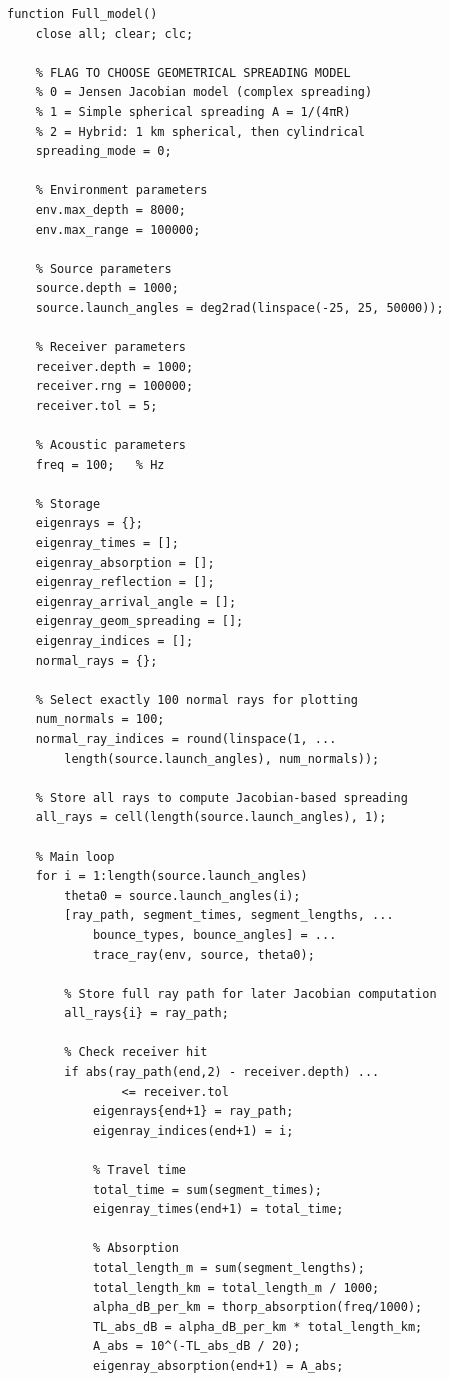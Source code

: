 \documentclass[fleqn]{jaes}
\begin{document}
\begin{verbatim}
function Full_model()
    close all; clear; clc;

    % FLAG TO CHOOSE GEOMETRICAL SPREADING MODEL
    % 0 = Jensen Jacobian model (complex spreading)
    % 1 = Simple spherical spreading A = 1/(4πR)
    % 2 = Hybrid: 1 km spherical, then cylindrical
    spreading_mode = 0;

    % Environment parameters
    env.max_depth = 8000;
    env.max_range = 100000;

    % Source parameters
    source.depth = 1000;
    source.launch_angles = deg2rad(linspace(-25, 25, 50000));

    % Receiver parameters
    receiver.depth = 1000;
    receiver.rng = 100000;
    receiver.tol = 5;

    % Acoustic parameters
    freq = 100;   % Hz

    % Storage
    eigenrays = {};
    eigenray_times = [];
    eigenray_absorption = [];
    eigenray_reflection = [];
    eigenray_arrival_angle = [];
    eigenray_geom_spreading = [];
    eigenray_indices = [];
    normal_rays = {};

    % Select exactly 100 normal rays for plotting
    num_normals = 100;
    normal_ray_indices = round(linspace(1, ...
        length(source.launch_angles), num_normals));

    % Store all rays to compute Jacobian-based spreading
    all_rays = cell(length(source.launch_angles), 1);

    % Main loop
    for i = 1:length(source.launch_angles)
        theta0 = source.launch_angles(i);
        [ray_path, segment_times, segment_lengths, ...
            bounce_types, bounce_angles] = ...
            trace_ray(env, source, theta0);

        % Store full ray path for later Jacobian computation
        all_rays{i} = ray_path;

        % Check receiver hit
        if abs(ray_path(end,2) - receiver.depth) ...
                <= receiver.tol
            eigenrays{end+1} = ray_path;
            eigenray_indices(end+1) = i;

            % Travel time
            total_time = sum(segment_times);
            eigenray_times(end+1) = total_time;

            % Absorption
            total_length_m = sum(segment_lengths);
            total_length_km = total_length_m / 1000;
            alpha_dB_per_km = thorp_absorption(freq/1000);
            TL_abs_dB = alpha_dB_per_km * total_length_km;
            A_abs = 10^(-TL_abs_dB / 20);
            eigenray_absorption(end+1) = A_abs;


\end{verbatim}
\end{document}
